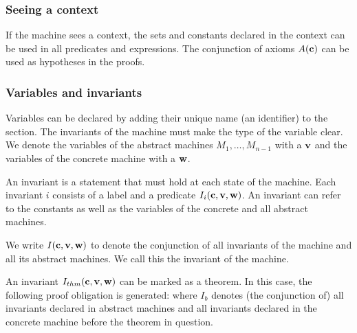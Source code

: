 
\subsubsection{Seeing a context}
If the machine sees a context, the sets and constants declared in the context can be used in
 all predicates and expressions.
The conjunction of axioms $A(\mathbf{c})$ can be used as hypotheses in the proofs.

\subsubsection{Variables and invariants}
Variables can be declared by adding their unique name (an identifier) to the  section. The invariants of the machine must make the type of the variable clear.
We denote the variables of the abstract machines $M_1,\ldots,M_{n-1}$ with a $\mathbf{v}$ and the variables of the concrete machine with a $\mathbf{w}$.

An invariant is a statement that must hold at each state of the machine.
Each invariant $i$ consists of a label and a predicate $I_i(\mathbf{c},\mathbf{v},\mathbf{w})$.
An invariant can refer to the constants as well as the variables of the concrete and all abstract machines.

We write $I(\mathbf{c},\mathbf{v},\mathbf{w})$ to denote the conjunction of all invariants
of the machine and all its abstract machines. We call this the invariant of the machine.

An invariant $I_{thm}(\mathbf{c},\mathbf{v},\mathbf{w})$ can be marked as a theorem. In this case, the following proof obligation is generated:
where $I_b$ denotes (the conjunction of) all invariants declared in abstract machines and all invariants declared in the concrete machine before
the theorem in question.

